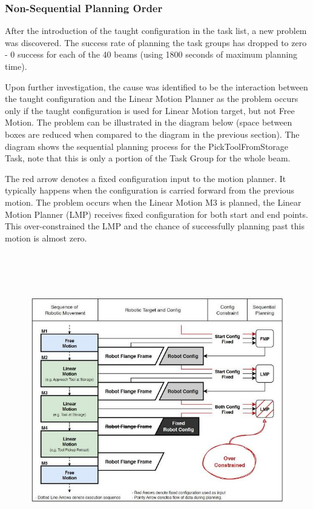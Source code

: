 \documentclass[11pt]{book}
\begin{document}
\subsubsection{Non-Sequential Planning Order}

After the introduction of the taught configuration in the task list, a new problem was discovered. The success rate of planning the task groups has dropped to zero - 0 success for each of the 40 beams (using 1800 seconds of maximum planning time).

Upon further investigation, the cause was identified to be the interaction between the taught configuration and the Linear Motion Planner as the problem occurs only if the taught configuration is used for Linear Motion target, but not Free Motion. The problem can be illustrated in the diagram below (space between boxes are reduced when compared to the diagram in the previous section). The diagram shows the sequential planning process for the PickToolFromStorage Task, note that this is only a portion of the Task Group for the whole beam. 

The red arrow denotes a fixed configuration input to the motion planner. It typically happens when the configuration is carried forward from the previous motion. The problem occurs when the Linear Motion M3 is planned, the Linear Motion Planner (LMP) receives fixed configuration for both start and end points. This over-constrained the LMP and the chance of successfully planning past this motion is almost zero.

\begin{figure}[H]
\includegraphics[width=15.92cm,height=12.88cm]{./images/image61.jpeg}
\end{figure}
\end{document}
